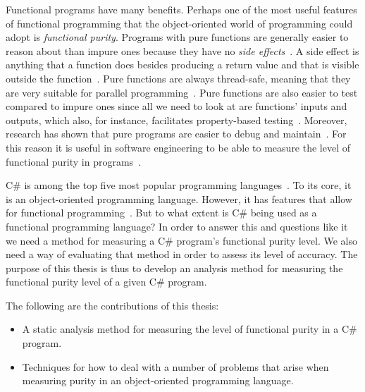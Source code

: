\documentclass[a4paper,12pt]{article}
\begin{document}
Functional programs have many benefits. Perhaps one of the most useful features of functional programming that the object-oriented world of programming could adopt is \textit{functional purity}. Programs with pure functions are generally easier to reason about than impure ones because they have no \textit{side effects}~\cite{alvin-alexander}. A side effect is anything that a function does besides producing a return value and that is visible outside the function~\cite{purity-in-java}. Pure functions are always thread-safe, meaning that they are very suitable for parallel programming~\cite{purity-in-java}. Pure functions are also easier to test compared to impure ones since all we need to look at are functions' inputs and outputs, which also, for instance, facilitates property-based testing~\cite{alvin-alexander}. Moreover, research has shown that pure programs are easier to debug and maintain~\cite{purity-in-javascript}. %
For this reason it is useful in software engineering to be able to measure the level of functional purity in programs~\cite{purity-in-javascript}.

C\# is among the top five most popular programming languages~\cite{tiobe}. To its core, it is an object-oriented programming language. However, it has features that allow for functional programming~\cite{hamid-mosalla}. But to what extent is C\# being used as a functional programming language?
In order to answer this and questions like it we need a method for measuring a C\# program's functional purity level. We also need a way of evaluating that method in order to assess its level of accuracy.
The purpose of this thesis is thus to develop an analysis method for measuring the functional purity level of a given C\# program.

The following are the contributions of this thesis:

\begin{itemize}
  \item A static analysis method for measuring the level of functional purity in a C\# program.
  \item Techniques for how to deal with a number of problems that arise when measuring purity in an object-oriented programming language.
\end{itemize}
\end{document}
